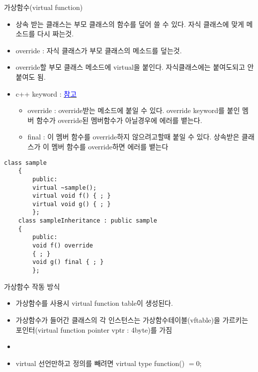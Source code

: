 \documentclass[10pt]{beamer}
\begin{document}
\begin{frame}{가상함수(virtual function)}
    \begin{itemize}
        \item 상속 받는 클래스는 부모 클래스의 함수를 덮어 쓸 수 있다. 자식 클래스에 맞게 메소드를 다시 짜는것.
        \item override : 자식 클래스가 부모 클래스의 메소드를 덮는것.
        \item override할 부모 클래스 메소드에 virtual을 붙인다. 자식클래스에는 붙여도되고 안붙여도 됨.
        \item c++ keyword : \href{https://youtu.be/JMw0F8FFe80}{\textcolor{blue}{참고}}
        \begin{itemize}
            \item  override : override받는 메소드에 붙일 수 있다. override keyword를 붙인 멤버 함수가 override된 멤버함수가 아닐경우에 에러를 뱉는다.
            \item  final : 이 멤버 함수를 override하지 않으려고할때 붙일 수 있다. 상속받은 클래스가 이 멤버 함수를 override하면 에러를 뱉는다
        \end{itemize}
    \end{itemize}
    
    \begin{lstlisting}[style = CStyle]
    class sample
    {
        public:
        virtual ~sample();
        virtual void f() { ; }
        virtual void g() { ; }
        };
    class sampleInheritance : public sample
    {
        public:
        void f() override
        { ; }
        void g() final { ; }
        };
    \end{lstlisting}
\end{frame}




\begin{frame}{가상함수 작동 방식}
    \begin{itemize}
        \item 가상함수를 사용시 virtual function table이 생성된다.
        \item 가상함수가 들어간 클래스의 각 인스턴스는 가상함수테이블(vftable)을 가르키는 포인터(virtual function pointer vptr : 4byte)를 가짐
        \item 
        \item virtual 선언만하고 정의를 빼려면 virtual type function() $=0$;
    \end{itemize}
\end{frame}
\end{document}
